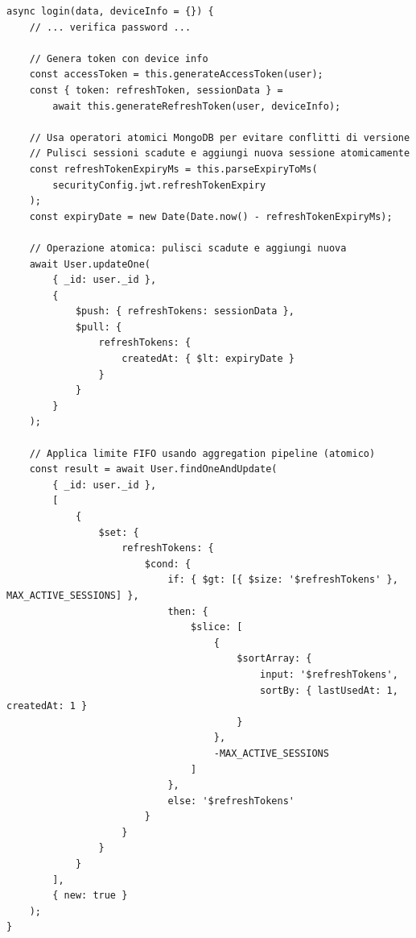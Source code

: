 \documentclass[11pt,a4paper]{article}
\begin{document}
\begin{lstlisting}[caption=Login con Operatori Atomici]
async login(data, deviceInfo = {}) {
    // ... verifica password ...
    
    // Genera token con device info
    const accessToken = this.generateAccessToken(user);
    const { token: refreshToken, sessionData } = 
        await this.generateRefreshToken(user, deviceInfo);

    // Usa operatori atomici MongoDB per evitare conflitti di versione
    // Pulisci sessioni scadute e aggiungi nuova sessione atomicamente
    const refreshTokenExpiryMs = this.parseExpiryToMs(
        securityConfig.jwt.refreshTokenExpiry
    );
    const expiryDate = new Date(Date.now() - refreshTokenExpiryMs);

    // Operazione atomica: pulisci scadute e aggiungi nuova
    await User.updateOne(
        { _id: user._id },
        {
            $push: { refreshTokens: sessionData },
            $pull: {
                refreshTokens: {
                    createdAt: { $lt: expiryDate }
                }
            }
        }
    );

    // Applica limite FIFO usando aggregation pipeline (atomico)
    const result = await User.findOneAndUpdate(
        { _id: user._id },
        [
            {
                $set: {
                    refreshTokens: {
                        $cond: {
                            if: { $gt: [{ $size: '$refreshTokens' }, MAX_ACTIVE_SESSIONS] },
                            then: {
                                $slice: [
                                    {
                                        $sortArray: {
                                            input: '$refreshTokens',
                                            sortBy: { lastUsedAt: 1, createdAt: 1 }
                                        }
                                    },
                                    -MAX_ACTIVE_SESSIONS
                                ]
                            },
                            else: '$refreshTokens'
                        }
                    }
                }
            }
        ],
        { new: true }
    );
}
\end{lstlisting}
\end{document}
